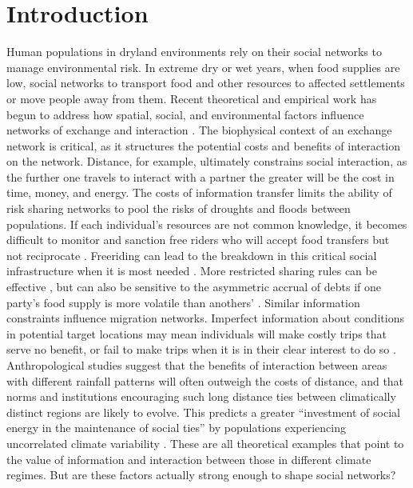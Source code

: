 \documentclass[10pt]{iopart}
\begin{document}
\section*{Introduction}
Human populations in dryland environments rely on their social networks to manage environmental risk. In extreme dry or wet years, when food supplies are low, social networks to transport food and other resources to affected settlements or move people away from them. Recent theoretical and empirical work has begun to address how spatial, social, and environmental factors influence networks of exchange and interaction \parencite{Nolin2010Food-SharingIndonesia,Koster2014,Hao2015a,Schnegg2015,Freeman2014}. The biophysical context of an exchange network is critical, as it structures the potential costs and benefits of interaction on the network. Distance, for example, ultimately constrains social interaction, as the further one travels to interact with a partner the greater will be the cost in time, money, and energy. The costs of information transfer limits the ability of risk sharing networks to pool the risks of droughts and floods between populations. If each individual's resources are not common knowledge, it becomes difficult to monitor and sanction free riders who will accept food transfers but not reciprocate \parencite{Hao2015a}. Freeriding can lead to the breakdown in this critical social infrastructure when it is most needed \parencite{Kohler1996}. More restricted sharing rules can be effective \parencite{Hegmon1996}, but can also be sensitive to the asymmetric accrual of debts if one party's food supply is more volatile than anothers' \parencite{Crabtree2015}. Similar information constraints influence migration networks. Imperfect information about conditions in potential target locations may mean individuals will make costly trips that serve no benefit, or fail to make trips when it is in their clear interest to do so \parencite{Anderies2011a}. Anthropological studies suggest that the benefits of interaction between areas with different rainfall patterns will often outweigh the costs of distance, and that norms and institutions encouraging such long distance ties between climatically distinct regions are likely to evolve. This predicts a greater ``investment of social energy in the maintenance of social ties'' by populations experiencing uncorrelated climate variability \parencite{Rautman1993a}. These are all theoretical examples that point to the value of information and interaction between those in different climate regimes. But are these factors actually strong enough to shape social networks? 
\end{document}
